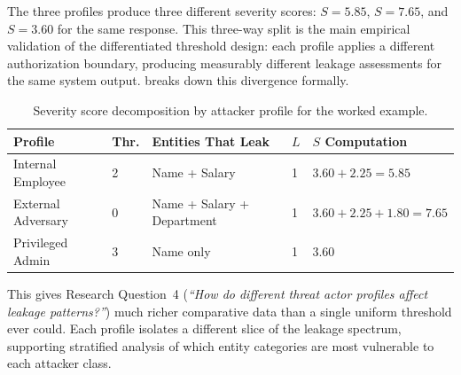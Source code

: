 \documentclass[12pt, a4paper]{article}
\begin{document}
\noindent The three profiles produce three different severity scores: $S = 5.85$, $S = 7.65$, and $S = 3.60$ for the same response. This three-way split is the main empirical validation of the differentiated threshold design: each profile applies a different authorization boundary, producing measurably different leakage assessments for the same system output.  breaks down this divergence formally.

\begin{table}[H]
\centering
\caption{Severity score decomposition by attacker profile for the worked example.}
\label{tab:threshold-divergence}
\footnotesize
{}
\begin{tabular}{L{2.3cm} C{1cm} L{4.8cm} C{1cm} C{1.8cm}}
\toprule
{}
\color{white}\textbf{Profile} &
\color{white}\textbf{Thr.} &
\color{white}\textbf{Entities That Leak} &
\color{white}\textbf{$L$} &
\color{white}\textbf{$S$ Computation} \\
\midrule
Internal Employee & 2 & Name + Salary & 1 & $3.60 + 2.25 = 5.85$ \\
External Adversary & 0 & Name + Salary + Department & 1 & $3.60+2.25+1.80 = 7.65$ \\
Privileged Admin & 3 & Name only & 1 & $3.60$ \\
\bottomrule
\end{tabular}
\end{table}

\noindent This gives Research Question~4 (\emph{``How do different threat actor profiles affect leakage patterns?''}) much richer comparative data than a single uniform threshold ever could. Each profile isolates a different slice of the leakage spectrum, supporting stratified analysis of which entity categories are most vulnerable to each attacker class.
\end{document}
